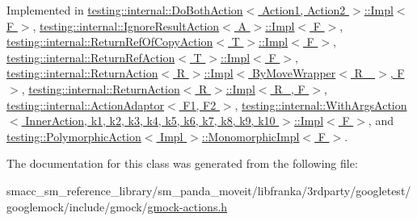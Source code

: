 Implemented in \hyperlink{classtesting_1_1internal_1_1DoBothAction_1_1Impl_aa8f102e1918e64266ddb9b00db2c4b5e}{testing\+::internal\+::\+Do\+Both\+Action$<$ Action1, Action2 $>$\+::\+Impl$<$ F $>$}, \hyperlink{classtesting_1_1internal_1_1IgnoreResultAction_1_1Impl_ad2b7d520f2d50cf640da1a039a81684f}{testing\+::internal\+::\+Ignore\+Result\+Action$<$ A $>$\+::\+Impl$<$ F $>$}, \hyperlink{classtesting_1_1internal_1_1ReturnRefOfCopyAction_1_1Impl_aa208a2fce99a1e2e1913c89ec7a3bc5d}{testing\+::internal\+::\+Return\+Ref\+Of\+Copy\+Action$<$ T $>$\+::\+Impl$<$ F $>$}, \hyperlink{classtesting_1_1internal_1_1ReturnRefAction_1_1Impl_ae65024d38782cd53a194346ace6ed9af}{testing\+::internal\+::\+Return\+Ref\+Action$<$ T $>$\+::\+Impl$<$ F $>$}, \hyperlink{classtesting_1_1internal_1_1ReturnAction_1_1Impl_3_01ByMoveWrapper_3_01R___01_4_00_01F_01_4_a4f6e45f593abffb7a8b26cebfc4a0262}{testing\+::internal\+::\+Return\+Action$<$ R $>$\+::\+Impl$<$ By\+Move\+Wrapper$<$ R\+\_\+ $>$, F $>$}, \hyperlink{classtesting_1_1internal_1_1ReturnAction_1_1Impl_ad643ea98eada205da6c4bcfb6c66cd2c}{testing\+::internal\+::\+Return\+Action$<$ R $>$\+::\+Impl$<$ R\+\_\+, F $>$}, \hyperlink{classtesting_1_1internal_1_1ActionAdaptor_a8d8a47a31f068cf6e0c95b91605d5540}{testing\+::internal\+::\+Action\+Adaptor$<$ F1, F2 $>$}, \hyperlink{classtesting_1_1internal_1_1WithArgsAction_1_1Impl_acdcb2f73c3f54e9ea639d9157d3f4e7c}{testing\+::internal\+::\+With\+Args\+Action$<$ Inner\+Action, k1, k2, k3, k4, k5, k6, k7, k8, k9, k10 $>$\+::\+Impl$<$ F $>$}, and \hyperlink{classtesting_1_1PolymorphicAction_1_1MonomorphicImpl_af657293ae1ac638802c0fd2486ee5f5b}{testing\+::\+Polymorphic\+Action$<$ Impl $>$\+::\+Monomorphic\+Impl$<$ F $>$}.



The documentation for this class was generated from the following file\+:\begin{DoxyCompactItemize}
\item 
smacc\+\_\+sm\+\_\+reference\+\_\+library/sm\+\_\+panda\+\_\+moveit/libfranka/3rdparty/googletest/googlemock/include/gmock/\hyperlink{gmock-actions_8h}{gmock-\/actions.\+h}\end{DoxyCompactItemize}

